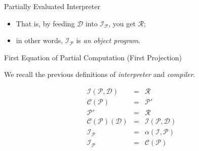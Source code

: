 \documentclass[aspectratio=169,dvipsnames]{beamer}
\renewcommand{\P}{\ensuremath{\mathcal{P}}\xspace}
\newcommand{\C}{\ensuremath{\mathcal{C}}\xspace}
\newcommand{\I}{\ensuremath{\mathcal{I}}\xspace}
\newcommand{\D}{\ensuremath{\mathcal{D}}\xspace}
\newcommand{\R}{\ensuremath{\mathcal{R}}\xspace}
\begin{document}
\begin{frame}{Partially Evaluated Interpreter}
    \begin{center}
    
        
    \end{center}

    \begin{itemize}
    \item That is, by feeding \D into $\I_\P$, you get \R;
    \item in other words, $\I_\P$ is \textit{an object program}.
    \end{itemize}
    
\end{frame}


\begin{frame}{First Equation of Partial Computation (First Projection)}

    

We recall the previous definitions of \textit{interpreter}
and \textit{compiler}.

\begin{eqnarray}
    \mathcal{I}(\mathcal{P}, \mathcal{D}) &=& \R \nonumber \\
    \C(\P)&=&\P' \nonumber \\
    \P' &=& \R \nonumber  \\
    \mathcal{C}(\mathcal{P})(\mathcal{D}) &=& \mathcal{I}(\mathcal{P},\mathcal{D}) \nonumber \\
    \mathcal{I}_{\mathcal{P}} &=&  \alpha(\mathcal{I},\mathcal{P}) \nonumber \\ 
    \mathcal{I}_{\mathcal{P}} &=&  \mathcal{C}(\mathcal{P})
\end{eqnarray}


\end{frame}
\end{document}
